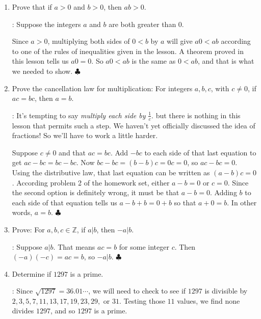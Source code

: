 \documentclass[11pt]{amsart}
\begin{document}
\begin{enumerate}


\medskip

\item Prove that if $a>0$ and $b>0$, then $ab>0$.

\medskip

: Suppose the integers $a$ and $b$ are both greater than $0$.

Since $a>0$, multiplying both sides of $0<b$ by $a$ will give $a0<ab$
according to one of the rules of inequalities given in the lesson. A 
theorem proved in this lesson tells us $a0=0$. So $a0<ab$ is the same as
$0<ab$, and that is what we needed to show. $\clubsuit$

\medskip

\item Prove the cancellation law for multiplication: 
For integers $a,b,c$, with $c\not=0$, if $ac=bc$, then $a=b$.

\medskip

: It's tempting to say {\it multiply each side by} $\displaystyle \frac{1}{c}$.
but there is nothing in this lesson that permits such a step. We haven't yet officially
discussed the idea of fractions! So we'll have to work a little harder.

Suppose $c\not= 0$ and that $ac=bc$. Add $-bc$ to each side of that last equation to get
$ac-bc = bc-bc$. Now $bc-bc = (b-b)c = 0c = 0$, so $ac-bc = 0$. 
Using the distributive law, that last equation can be written as $(a-b)c = 0$.
According problem 2 of the homework set, either $a-b = 0$ or $c=0$. Since the second option is definitely
wrong, it must be that $a-b = 0$. Adding $b$ to each side of that equation tells us
$a-b+ b = 0+b$ so that $a+0 = b$. In other words, $a=b$. $\clubsuit$

\medskip

\item Prove: For $a,b,c\in \mathbb{Z}$, if $a|b$, then $-a|b$.

\medskip

: Suppose $a|b$. That means $ac = b$ for some integer $c$.
Then $(-a)(-c) = ac = b$, so $-a|b$. $\clubsuit$

\medskip

\item Determine if $1297$ is a prime.

\medskip

: Since $\sqrt{1297} = 36.01\cdots$, we will need to check to see if
$1297$ is divisible by $2,3,5,7,11,13,17,19,23,29,\text{ or }  31$. Testing those $11$ values,
we find none divides $1297$, and so $1297$ is a prime.

\end{enumerate}
\end{document}
